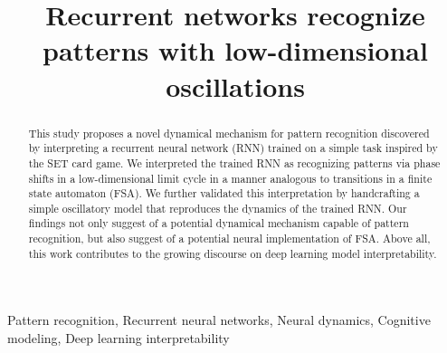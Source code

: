 \documentclass[conference]{IEEEtran}
\begin{document}
\title{Recurrent networks recognize patterns with low-dimensional oscillations}

\author{
}

\maketitle

\begin{abstract}
This study proposes a novel dynamical mechanism for pattern recognition discovered by interpreting a recurrent neural network (RNN) trained on a simple task inspired by the SET card game. We interpreted the trained RNN as recognizing patterns via phase shifts in a low-dimensional limit cycle in a manner analogous to transitions in a finite state automaton (FSA). We further validated this interpretation by handcrafting a simple oscillatory model that reproduces the dynamics of the trained RNN. Our findings not only suggest of a potential dynamical mechanism capable of pattern recognition, but also suggest of a potential neural implementation of FSA. Above all, this work contributes to the growing discourse on deep learning model interpretability.
\end{abstract}

\begin{IEEEkeywords}
Pattern recognition, Recurrent neural networks, Neural dynamics, Cognitive modeling, Deep learning interpretability
\end{IEEEkeywords}
\end{document}
